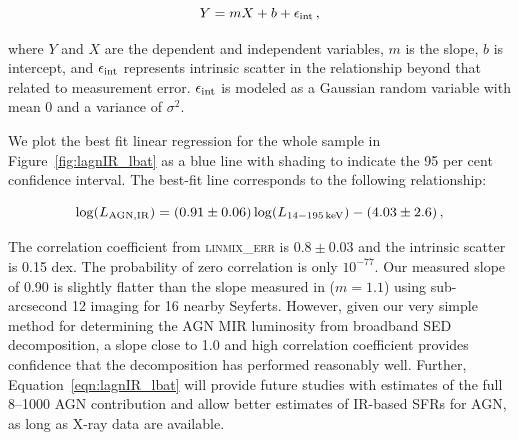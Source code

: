 \documentclass[fleqn, usenatbib]{mnras}
\begin{document}
\begin{equation}\label{eqn:lin_mod}
Y = mX + b + \epsilon_{\rm int}\,,
\end{equation}

\noindent where $Y$ and $X$ are the dependent and independent variables, $m$ is the slope, $b$ is intercept, and $\epsilon_{\rm int}$ represents intrinsic scatter in the relationship beyond that related to measurement error. $\epsilon_{\rm int}$ is modeled as a Gaussian random variable with mean 0 and a variance of $\sigma^2$. 

We plot the best fit linear regression for the whole sample in Figure~\ref{fig:lagnIR_lbat} as a blue line with shading to indicate the 95 per cent confidence interval. The best-fit line corresponds to the following relationship:

\begin{equation}\label{eqn:lagnIR_lbat}
\log(L_{\rm AGN,IR}) =  (0.91\pm0.06)\log(L_{\rm 14-195\,keV}) - (4.03\pm2.6)\,,
\end{equation}



The correlation coefficient from \textsc{linmix\_err} is $0.8\pm0.03$ and the intrinsic scatter is 0.15 dex. The probability of zero correlation is only $10^{-77}$. Our measured slope of 0.90 is slightly flatter than the slope measured in \citet{Gandhi:2009kx} ($m=1.1$) using sub-arcsecond 12 \micron{} imaging for 16 nearby Seyferts. However, given our very simple method for determining the AGN MIR luminosity from broadband SED decomposition, a slope close to 1.0 and high correlation coefficient provides confidence that the decomposition has performed reasonably well. Further, Equation~\ref{eqn:lagnIR_lbat} will provide future studies with estimates of the full 8--1000 \micron{} AGN contribution and allow better estimates of IR-based SFRs for AGN, as long as X-ray data are available.
\end{document}
